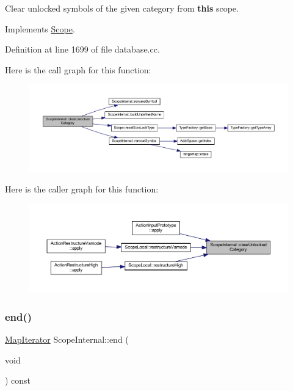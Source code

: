 Clear unlocked symbols of the given category from {\bfseries{this}} scope. 



Implements \mbox{\hyperlink{class_scope_a15fc66a463ca11a4c533991cea0639c8}{Scope}}.



Definition at line 1699 of file database.\+cc.

Here is the call graph for this function\+:
\nopagebreak
\begin{figure}[H]
\begin{center}
\leavevmode
\includegraphics[width=350pt]{class_scope_internal_ac73cc9a432d1e7a383c9758486ffe58d_cgraph}
\end{center}
\end{figure}
Here is the caller graph for this function\+:
\nopagebreak
\begin{figure}[H]
\begin{center}
\leavevmode
\includegraphics[width=350pt]{class_scope_internal_ac73cc9a432d1e7a383c9758486ffe58d_icgraph}
\end{center}
\end{figure}
\mbox{\label{class_scope_internal_a47df37673b1cea67ac1b4980037eafe0}} 
\subsubsection{\texorpdfstring{end()}{end()}}
{\footnotesize\ttfamily \mbox{\hyperlink{class_map_iterator}{Map\+Iterator}} Scope\+Internal\+::end (\begin{DoxyParamCaption}\item[{void}]{ }\end{DoxyParamCaption}) const\hspace{0.3cm}{\ttfamily [virtual]}}



